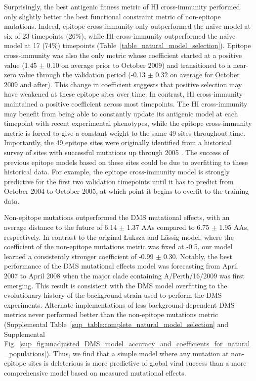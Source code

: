 Surprisingly, the best antigenic fitness metric of HI cross-immunity performed only slightly better the best functional constraint metric of non-epitope mutations.
Indeed, epitope cross-immunity only outperformed the naive model at six of 23 timepoints (26\%), while HI cross-immunity outperformed the naive model at 17 (74\%) timepoints (Table~\ref{table_natural_model_selection}).
Epitope cross-immunity was also the only metric whose coefficient started at a positive value (1.45 $\pm$ 0.10 on average prior to October 2009) and transitioned to a near-zero value through the validation period (-0.13 $\pm$ 0.32 on average for October 2009 and after).
This change in coefficient suggests that positive selection may have weakened at these epitope sites over time.
In contrast, HI cross-immunity maintained a positive coefficient across most timepoints.
The HI cross-immunity may benefit from being able to constantly update its antigenic model at each timepoint with recent experimental phenotypes, while the epitope cross-immunity metric is forced to give a constant weight to the same 49 sites throughout time.
Importantly, the 49 epitope sites were originally identified from a historical survey of sites with successful mutations up through 2005 \cite{Shih:2007bd}.
The success of previous epitope models based on these sites could be due to overfitting to these historical data.
For example, the epitope cross-immunity model is strongly predictive for the first two validation timepoints until it has to predict from October 2004 to October 2005, at which point it begins to overfit to the training data.

Non-epitope mutations outperformed the DMS mutational effects, with an average distance to the future of 6.14 $\pm$ 1.37 AAs compared to 6.75 $\pm$ 1.95 AAs, respectively.
In contrast to the original {\L}uksza and L\"assig \cite{Luksza:2014hj} model, where the coefficient of the non-epitope mutations metric was fixed at -0.5, our model learned a consistently stronger coefficient of -0.99 $\pm$ 0.30.
Notably, the best performance of the DMS mutational effects model was forecasting from April 2007 to April 2008 when the major clade containing A/Perth/16/2009 was first emerging.
This result is consistent with the DMS model overfitting to the evolutionary history of the background strain used to perform the DMS experiments.
Alternate implementations of less background-dependent DMS metrics never performed better than the non-epitope mutations metric (Supplemental Table~\ref{sup_table:complete_natural_model_selection} and Supplemental Fig.~\ref{sup_fig:unadjusted_DMS_model_accuracy_and_coefficients_for_natural_populations}).
Thus, we find that a simple model where any mutation at non-epitope sites is deleterious is more predictive of global viral success than a more comprehensive model based on measured mutational effects.

